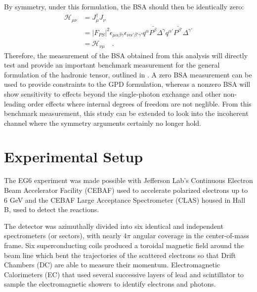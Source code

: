 \documentclass[10pt,prd,aps,showpacs,twocolumn,unsortedaddress]{revtex4-1}
\newcommand\abv[1]{\left|#1 \right|}
\begin{document}
  By symmetry, under this formulation, the BSA should then be identically zero:
  \begin{align*}
    \mathcal H_{\mu\nu} &= J^\dagger_\mu J_\nu
    \\
                        &= \abv{F_{PS}}^2 \epsilon_{\mu\alpha\beta\gamma} \epsilon_{\nu\alpha'\beta'\gamma'}
                        q^\alpha \bar{P^\beta}\Delta^\gamma q^{\alpha'} \bar{P^{\beta'}}\Delta^{\gamma'}
    \\
                        &= \mathcal H_{\nu\mu} \quad .
  \end{align*}
  Therefore, the measurement of the BSA obtained from this analysis will directly test and provide an important benchmark measurement for the general formulation of the hadronic tensor, outlined in \cite{ji}. A zero BSA measurement can be used to provide constraints to the GPD formulation, whereas a nonzero BSA will show sensitivity to effects beyond the single-photon exchange and other non-leading order effects where internal degrees of freedom are not neglible. From this benchmark measurement, this study can be extended to look into the incoherent channel where the symmetry arguments certainly no longer hold. 


\section{Experimental Setup \label{setup}}
The EG6 experiment was made possible with Jefferson Lab's Continuous Electron Beam Accelerator Facility (CEBAF) used
to accelerate polarized electrons up to 6 GeV and the CEBAF Large Acceptance Spectrometer (CLAS) housed in Hall B, used to detect the reactions.

The detector was azimuthally divided into six identical and independent spectrometers 
(or sectors), with nearly $4\pi$ angular coverage in the center-of-mass frame.
Six superconducting coils produced a toroidal magnetic field around the beam line which bent the
trajectories of the scattered electrons so that Drift Chambers (DC) are able to measure their momentum. 
Electromagnetic Calorimeters (EC) that used several successive layers of 
lead and scintillator 
to sample the electromagnetic showers to identify electrons and photons.
\end{document}
